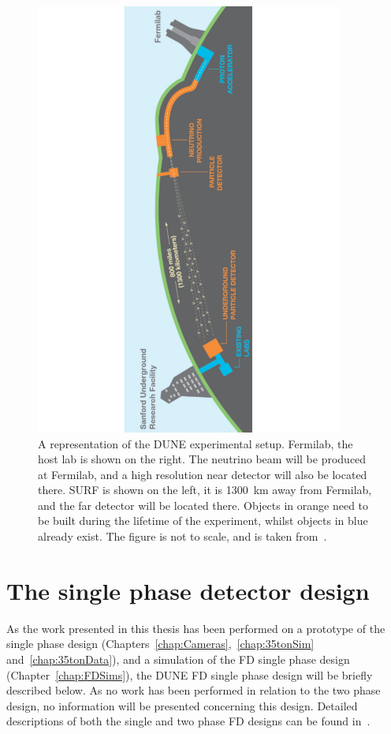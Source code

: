 \begin{figure}
  \centering
  \includegraphics[width=0.9\textwidth]{DUNESchematic}
  \caption[A representation of the DUNE experimental setup]
          {A representation of the DUNE experimental setup. Fermilab, the host lab is shown on the right. The neutrino beam will be produced at Fermilab, and a high resolution near detector will also be located there. SURF is shown on the left, it is 1300~km away from Fermilab, and the far detector will be located there. Objects in orange need to be built during the lifetime of the experiment, whilst objects in blue already exist. The figure is not to scale, and is taken from~\citep{DUNECDR_V1}.}
  \label{fig:DUNESchematic}
\end{figure}

\section{The single phase detector design} \label{sec:DUNEDetector_SP}
As the work presented in this thesis has been performed on a prototype of the single phase design (Chapters~\ref{chap:Cameras},~\ref{chap:35tonSim} and~\ref{chap:35tonData}), and a simulation of the FD single phase design (Chapter~\ref{chap:FDSims}), the DUNE FD single phase design will be briefly described below. As no work has been performed in relation to the two phase design, no information will be presented concerning this design. Detailed descriptions of both the single and two phase FD designs can be found in~\citep{DUNECDR_V4}. \\

